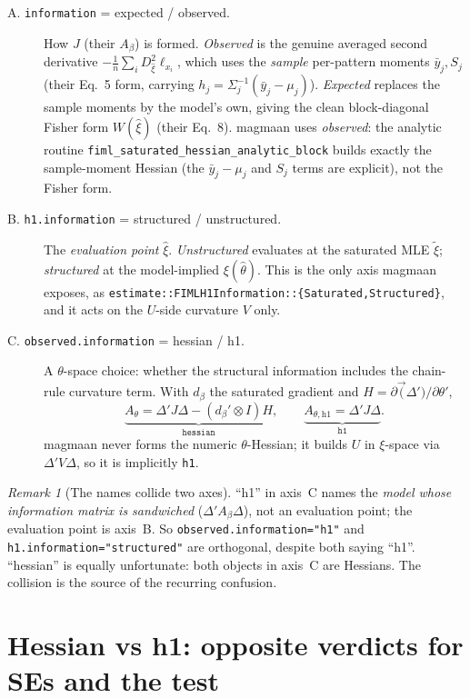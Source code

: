 \documentclass[11pt]{article}
\theoremstyle{plain}
\theoremstyle{remark}
\newtheorem*{remark}{Remark}
\begin{document}
\begin{description}
\item[A. \texttt{information} = expected / observed.] How \(J\) (their
\(A_\beta\)) is formed. \emph{Observed} is the genuine averaged second
derivative \(-\tfrac1n\sum_i D^2_{\hat\xi}\ell_{x_i}\), which uses the
\emph{sample} per-pattern moments \(\bar y_j,S_j\) (their Eq.~5 form, carrying
\(h_j=\Sigma_j^{-1}(\bar y_j-\mu_j)\)). \emph{Expected} replaces the sample
moments by the model's own, giving the clean block-diagonal Fisher form
\(W(\hat\xi)\) (their Eq.~8). magmaan uses \emph{observed}: the analytic routine
\verb|fiml_saturated_hessian_analytic_block| builds exactly the sample-moment
Hessian (the \(\bar y_j-\mu_j\) and \(S_j\) terms are explicit), not the Fisher
form.

\item[B. \texttt{h1.information} = structured / unstructured.] The
\emph{evaluation point} \(\hat\xi\). \emph{Unstructured} evaluates at the
saturated MLE \(\tilde\xi\); \emph{structured} at the model-implied
\(\xi(\hat\theta)\). This is the only axis magmaan exposes, as
\verb|estimate::FIMLH1Information::{Saturated,Structured}|, and it acts on the
\(U\)-side curvature \(V\) only.

\item[C. \texttt{observed.information} = hessian / h1.] A \(\theta\)-space
choice: whether the structural information includes the chain-rule curvature
term. With \(d_\beta\) the saturated gradient and \(H=\partial\vec(\Delta')/
\partial\theta'\),
\[
  \underbrace{A_\theta = \Delta'J\Delta - (d_\beta'\otimes I)H}_{\texttt{hessian}},
  \qquad
  \underbrace{A_{\theta,\mathrm{h1}} = \Delta'J\Delta}_{\texttt{h1}} .
\]
magmaan never forms the numeric \(\theta\)-Hessian; it builds \(U\) in
\(\xi\)-space via \(\Delta'V\Delta\), so it is implicitly \texttt{h1}.
\end{description}

\begin{remark}[The names collide two axes]
``h1'' in axis~C names the \emph{model whose information matrix is sandwiched}
(\(\Delta'A_\beta\Delta\)), not an evaluation point; the evaluation point is
axis~B. So \texttt{observed.information="h1"} and
\texttt{h1.information="structured"} are orthogonal, despite both saying ``h1''.
``hessian'' is equally unfortunate: both objects in axis~C are Hessians. The
collision is the source of the recurring confusion.
\end{remark}

\section*{Hessian vs h1: opposite verdicts for SEs and the test}
\label{sec:hessh1}
\end{document}
